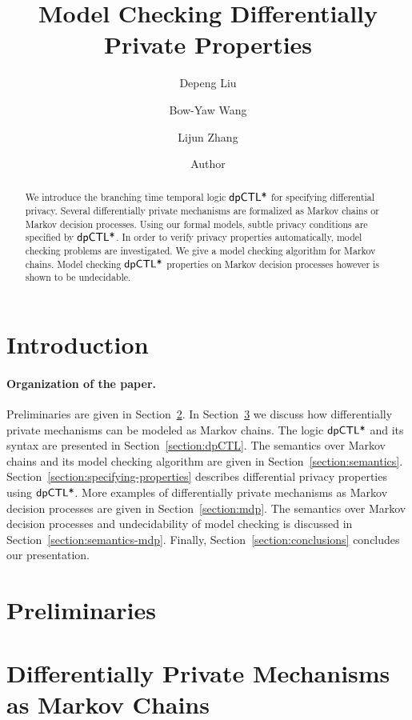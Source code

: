 \documentclass{llncs}
\title{Model Checking Differentially Private Properties}
\author{
Depeng Liu\inst{1}
\and
Bow-Yaw Wang\inst{2}
\and
Lijun Zhang\inst{1}}
\institute{
Chinese Academy of Sciences
\and
Academia Sinica
}
\author{Author}
\institute{Institute}
\begin{document}
\maketitle

\begin{abstract}
  We introduce the branching time temporal logic $\textsf{dpCTL*}$ for
  specifying differential privacy. Several differentially private
  mechanisms are formalized as Markov chains or Markov decision
  processes. Using our formal models, subtle privacy conditions
  are specified by $\textsf{dpCTL*}$. In order to verify privacy properties
  automatically, model checking problems are investigated.  We
  give a model checking algorithm for Markov chains. Model checking
  $\textsf{dpCTL*}$ properties on Markov decision processes however is
  shown to be undecidable.
\end{abstract}

\section{Introduction}
\label{section:introduction}


\noindent
\paragraph{Organization of the paper.}
Preliminaries are given in Section~\ref{section:preliminaries}.
In Section~\ref{section:examples} we discuss how differentially private mechanisms can be modeled as Markov chains.
The logic $\textsf{dpCTL*}$ and its syntax are presented in Section~\ref{section:dpCTL}. The semantics over Markov chains and its model checking algorithm are given in Section~\ref{section:semantics}.
Section~\ref{section:specifying-properties} describes differential privacy properties using $\textsf{dpCTL*}$.
More examples of differentially private mechanisms as Markov decision processes are given in Section~\ref{section:mdp}.
The semantics over Markov decision processes and undecidability of model checking is discussed in Section~\ref{section:semantics-mdp}.
Finally,
Section~\ref{section:conclusions} concludes our presentation.

\section{Preliminaries}
\label{section:preliminaries}


\section{Differentially Private Mechanisms as Markov Chains}
\label{section:examples}

\end{document}
